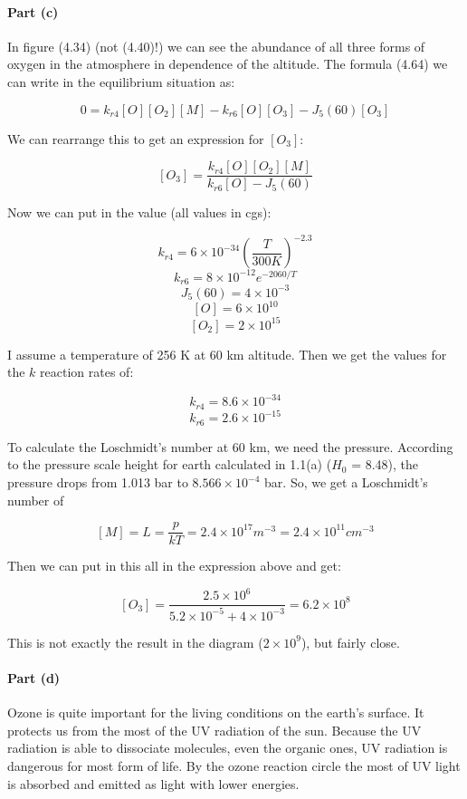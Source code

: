 \documentclass[12pt,a4paper]{article}
\begin{document}
\paragraph{Part (c)}

In figure (4.34) (not (4.40)!) we can see the abundance of all three forms of oxygen in the atmosphere in dependence of the altitude. The formula (4.64) we can write in the equilibrium situation as:

$$0 = k_{r4} [O][O_2][M] - k_{r6}[O][O_3] - J_5(60)[O_3]$$

We can rearrange this to get an expression for $[O_3]$:

$$[O_3] = \frac{k_{r4} [O][O_2][M]}{k_{r6}[O] - J_5(60)}$$

Now we can put in the value (all values in cgs):

$$k_{r4} = 6 \times 10^{-34} \left(\frac{T}{300K}\right)^{-2.3}$$
$$k_{r6} = 8 \times 10^{-12} e^{-2060/T}$$
$$J_5(60) = 4 \times 10^{-3}$$
$$[O] = 6 \times 10^{10}$$
$$[O_2] = 2 \times 10^{15}$$

I assume a temperature of 256 K at 60 km altitude. Then we get the values for the $k$ reaction rates of:

$$k_{r4} = 8.6 \times 10^{-34}$$
$$k_{r6} = 2.6 \times 10^{-15}$$

To calculate the Loschmidt's number at 60 km, we need the pressure. According to the pressure scale height for earth calculated in 1.1(a) ($H_0$ = 8.48), the pressure drops from 1.013 bar to $8.566 \times 10^{-4}$ bar. So, we get a Loschmidt's number of

$$[M] = L = \frac{p}{k T} = 2.4 \times 10^{17} m^{-3} = 2.4 \times 10^{11} cm^{-3}$$

Then we can put in this all in the expression above and get:

$$[O_3] = \frac{2.5 \times 10^{6}}{5.2 \times 10^{-5} + 4 \times 10^{-3}} = 6.2 \times 10^{8}$$

This is not exactly the result in the diagram ($2 \times 10^9$), but fairly close.

\paragraph{Part (d)}

Ozone is quite important for the living conditions on the earth's surface. It protects us from the most of the UV radiation of the sun. Because the UV radiation is able to dissociate molecules, even the organic ones, UV radiation is dangerous for most form of life. By the ozone reaction circle the most of UV light is absorbed and emitted as light with lower energies.
\end{document}
